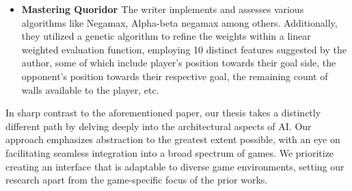 \begin{itemize}
    \item \textbf{Mastering Quoridor \citep{Glendenning2002MasteringQ}}
    The writer implements and assesses various algorithms like Negamax, Alpha-beta negamax among others.
    Additionally, they utilized a genetic algorithm to refine the weights within a linear weighted evaluation
    function, employing 10 distinct features suggested by the author, some of which include player's position
    towards their goal side, the opponent's position towards their respective goal, the remaining count of
    walls available to the player, etc.
\end{itemize}


In sharp contrast to the aforementioned paper, our thesis takes a distinctly different path by delving deeply
into the architectural aspects of AI. Our approach emphasizes abstraction to the greatest extent possible, with
an eye on facilitating seamless integration into a broad spectrum of games. We prioritize creating an
interface that is adaptable to diverse game environments, setting our research apart from the game-specific
focus of the prior works.



